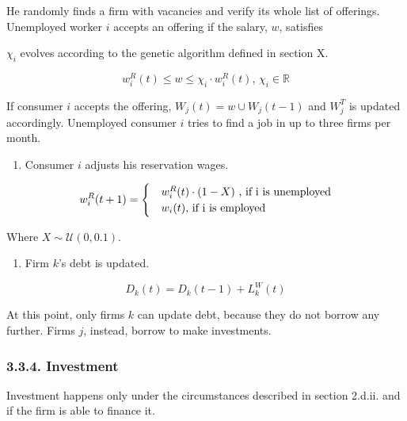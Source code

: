 \documentclass[11pt,]{article}
\providecommand{\tightlist}{%
\setlength{\itemsep}{0pt}\setlength{\parskip}{0pt}}
\begin{document}
He randomly finds a firm with vacancies and verify its whole list of
offerings. Unemployed worker \(i\) accepts an offering if the salary,
\(w\), satisfies

\(\chi_i\) evolves according to the genetic algorithm defined in section
X.

\begin{equation}
w^R_i(t) \leq w \leq \chi_i \cdot w^R_i(t) \text{, } \chi_i \in \mathbb{R}
\end{equation}

If consumer \(i\) accepts the offering, \(W_j(t) = w \cup W_j(t-1)\) and
\(W_j^T\) is updated accordingly. Unemployed consumer \(i\) tries to
find a job in up to three firms per month.

\begin{enumerate}
\def\labelenumi{\alph{enumi}.}
\setcounter{enumi}{7}
\tightlist
\item
  Consumer \(i\) adjusts his reservation wages.
\end{enumerate}

\begin{equation}
  w_i^R(t+1) = 
  \begin{cases}
    & w_i^R(t)\cdot (1 - X)\ \text{, if } $i$ \text{ is unemployed} \\
    & w_i(t) \text{, if } $i$ \text{ is employed}
  \end{cases}
\end{equation}

Where \(X \sim \mathcal{U}(0,0.1)\).

\begin{enumerate}
\def\labelenumi{\roman{enumi}.}
\tightlist
\item
  Firm \(k\)'s debt is updated.
\end{enumerate}

\begin{equation}
  D_k(t) = D_k(t-1) + L_k^W(t) 
\end{equation}

At this point, only firms \(k\) can update debt, because they do not
borrow any further. Firms \(j\), instead, borrow to make investments.

\subsubsection{3.3.4. Investment}\label{investment}

Investment happens only under the circumstances described in section
2.d.ii. and if the firm is able to finance it.
\end{document}
